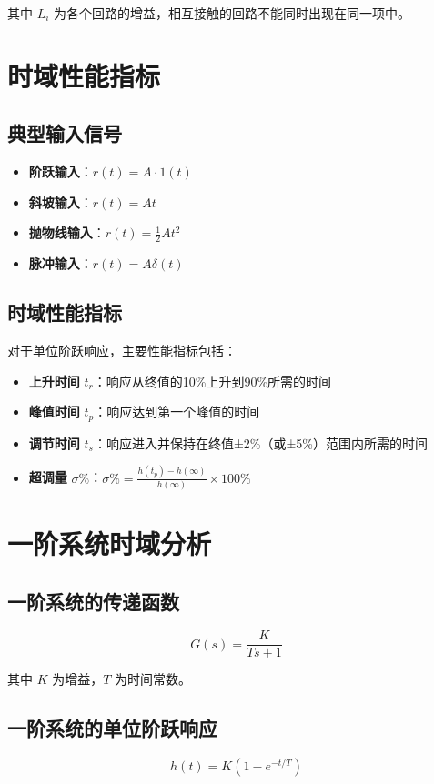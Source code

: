 \documentclass[12pt,a4paper]{article}
\begin{document}
其中 $L_i$ 为各个回路的增益，相互接触的回路不能同时出现在同一项中。

\section{时域性能指标}

\subsection{典型输入信号}
\begin{itemize}
    \item \textbf{阶跃输入}：$r(t) = A \cdot 1(t)$
    \item \textbf{斜坡输入}：$r(t) = At$
    \item \textbf{抛物线输入}：$r(t) = \frac{1}{2}At^2$
    \item \textbf{脉冲输入}：$r(t) = A\delta(t)$
\end{itemize}

\subsection{时域性能指标}
对于单位阶跃响应，主要性能指标包括：
\begin{itemize}
    \item \textbf{上升时间} $t_r$：响应从终值的10\%上升到90\%所需的时间
    \item \textbf{峰值时间} $t_p$：响应达到第一个峰值的时间
    \item \textbf{调节时间} $t_s$：响应进入并保持在终值±2\%（或±5\%）范围内所需的时间
    \item \textbf{超调量} $\sigma\%$：$\sigma\% = \frac{h(t_p) - h(\infty)}{h(\infty)} \times 100\%$
\end{itemize}

\section{一阶系统时域分析}

\subsection{一阶系统的传递函数}
\[G(s) = \frac{K}{Ts + 1}\]

其中 $K$ 为增益，$T$ 为时间常数。

\subsection{一阶系统的单位阶跃响应}
\[h(t) = K(1 - e^{-t/T})\]
\end{document}
